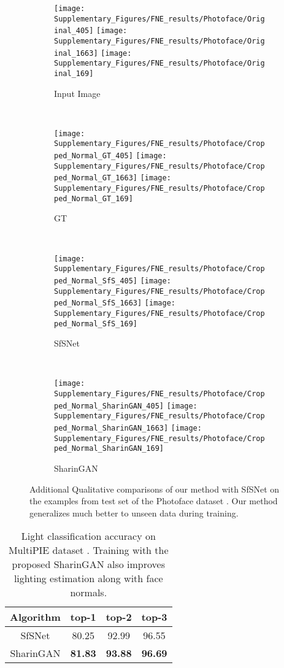 \documentclass[10pt,twocolumn,letterpaper]{article}
\begin{document}
\begin{figure}[t]
    \centering
    \begin{subfigure}{0.25\linewidth}{
        \texttt{[image: Supplementary\_Figures/FNE\_results/Photoface/Original\_405]}
        \texttt{[image: Supplementary\_Figures/FNE\_results/Photoface/Original\_1663]}
        \texttt{[image: Supplementary\_Figures/FNE\_results/Photoface/Original\_169]}}
        \caption{Input Image}
    \end{subfigure}~
    \begin{subfigure}{0.25\linewidth}{
        \texttt{[image: Supplementary\_Figures/FNE\_results/Photoface/Cropped\_Normal\_GT\_405]}
        \texttt{[image: Supplementary\_Figures/FNE\_results/Photoface/Cropped\_Normal\_GT\_1663]}
        \texttt{[image: Supplementary\_Figures/FNE\_results/Photoface/Cropped\_Normal\_GT\_169]}}
        \caption{GT}
    \end{subfigure}~
    \begin{subfigure}{0.25\linewidth}{
        \texttt{[image: Supplementary\_Figures/FNE\_results/Photoface/Cropped\_Normal\_SfS\_405]}
        \texttt{[image: Supplementary\_Figures/FNE\_results/Photoface/Cropped\_Normal\_SfS\_1663]}
        \texttt{[image: Supplementary\_Figures/FNE\_results/Photoface/Cropped\_Normal\_SfS\_169]}}
        \caption{SfSNet\cite{SfSNet}}
    \end{subfigure}~
    \begin{subfigure}{0.25\linewidth}{
        \texttt{[image: Supplementary\_Figures/FNE\_results/Photoface/Cropped\_Normal\_SharinGAN\_405]}
        \texttt{[image: Supplementary\_Figures/FNE\_results/Photoface/Cropped\_Normal\_SharinGAN\_1663]}
        \texttt{[image: Supplementary\_Figures/FNE\_results/Photoface/Cropped\_Normal\_SharinGAN\_169]}}
        \caption{SharinGAN}
    \end{subfigure}\caption{Additional Qualitative comparisons of our method with SfSNet on the examples from test set of the Photoface dataset \cite{Photoface}. Our method generalizes much better to unseen data during training. }
\label{fig:FNE_SharinGAN_photoface_supplementary}
\end{figure}
\begin{table}[!h]
\centering
    \begin{tabular}{|c||c|c|c|}
    \hline
        Algorithm & top-1 & top-2 & top-3\\
        \hline
        SfSNet \cite{SfSNet} & 80.25 & 92.99 & 96.55\\
        SharinGAN & \textbf{81.83} & \textbf{93.88} & \textbf{96.69}\\
    \hline
    \end{tabular}
\caption{Light classification accuracy on MultiPIE dataset \cite{Multipie}. Training with the proposed SharinGAN also improves lighting estimation along with face normals.}
        \vspace{-5mm}
    \label{tab:ablation_sharingan_multipie}
\end{table}
\end{document}
